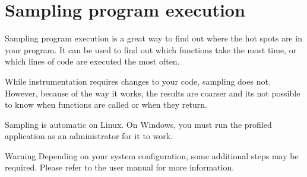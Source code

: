 \chapter{Sampling program execution }
\hypertarget{md__mono_engine_2thirdparty_2tracy_2profiler_2src_2achievements_2_sampling_intro}{}\label{md__mono_engine_2thirdparty_2tracy_2profiler_2src_2achievements_2_sampling_intro}
\label{md__mono_engine_2thirdparty_2tracy_2profiler_2src_2achievements_2_sampling_intro_autotoc_md1113}%
%


Sampling program execution is a great way to find out where the hot spots are in your program. It can be used to find out which functions take the most time, or which lines of code are executed the most often.

While instrumentation requires changes to your code, sampling does not. However, because of the way it works, the results are coarser and it\textquotesingle{}s not possible to know when functions are called or when they return.

Sampling is automatic on Linux. On Windows, you must run the profiled application as an administrator for it to work.

\begin{DoxyWarning}{Warning}
Depending on your system configuration, some additional steps may be required. Please refer to the user manual for more information. 
\end{DoxyWarning}
